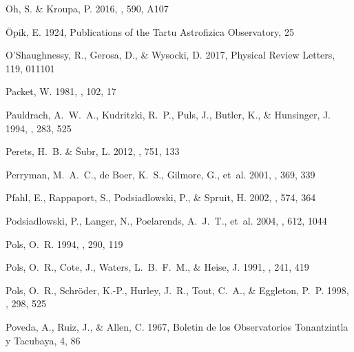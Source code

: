 \documentclass{aa}
\begin{document}
\begin{thebibliography}{242}
{Oh}, S. \& {Kroupa}, P. 2016, \aap, 590, A107

{{\"O}pik}, E. 1924, Publications of the Tartu Astrofizica Observatory, 25

{O'Shaughnessy}, R., {Gerosa}, D., \& {Wysocki}, D. 2017, Physical Review
  Letters, 119, 011101

{Packet}, W. 1981, \aap, 102, 17

{Pauldrach}, A.~W.~A., {Kudritzki}, R.~P., {Puls}, J., {Butler}, K., \&
  {Hunsinger}, J. 1994, \aap, 283, 525

{Perets}, H.~B. \& {{\v S}ubr}, L. 2012, \apj, 751, 133

{Perryman}, M.~A.~C., {de Boer}, K.~S., {Gilmore}, G., {et~al.} 2001, \aap,
  369, 339

{Pfahl}, E., {Rappaport}, S., {Podsiadlowski}, P., \& {Spruit}, H. 2002, \apj,
  574, 364

{Podsiadlowski}, P., {Langer}, N., {Poelarends}, A.~J.~T., {et~al.} 2004, \apj,
  612, 1044

{Pols}, O.~R. 1994, \aap, 290, 119

{Pols}, O.~R., {Cote}, J., {Waters}, L.~B.~F.~M., \& {Heise}, J. 1991, \aap,
  241, 419

{Pols}, O.~R., {Schr{\"o}der}, K.-P., {Hurley}, J.~R., {Tout}, C.~A., \&
  {Eggleton}, P.~P. 1998, \mnras, 298, 525

{Poveda}, A., {Ruiz}, J., \& {Allen}, C. 1967, Boletin de los Observatorios
  Tonantzintla y Tacubaya, 4, 86


\end{thebibliography}
\end{document}
